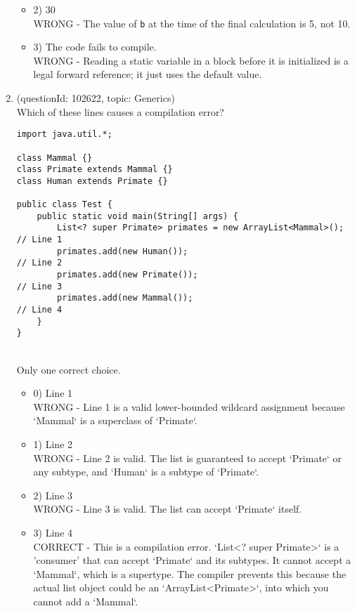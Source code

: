 \documentclass[12pt]{article}
\begin{document}
\begin{enumerate}[label=(\arabic*)]
\begin{itemize}
\item 2) 30
 \\ 
WRONG - The value of \verb|b| at the time of the final calculation is 5, not 10.

\item 3) The code fails to compile.
 \\ 
WRONG - Reading a static variable in a block before it is initialized is a legal forward reference; it just uses the default value.

\end{itemize}
\item (questionId: 102622, topic: Generics) \\ 
Which of these lines causes a compilation error?\begin{verbatim}
import java.util.*;

class Mammal {}
class Primate extends Mammal {}
class Human extends Primate {}

public class Test {
    public static void main(String[] args) {
        List<? super Primate> primates = new ArrayList<Mammal>(); // Line 1
        primates.add(new Human());                                // Line 2
        primates.add(new Primate());                              // Line 3
        primates.add(new Mammal());                               // Line 4
    }
}
\end{verbatim}
\\ \noindent Only one correct choice. 
\begin{itemize}
\item 0) Line 1
 \\ 
WRONG - Line 1 is a valid lower-bounded wildcard assignment because `Mammal` is a superclass of `Primate`.

\item 1) Line 2
 \\ 
WRONG - Line 2 is valid. The list is guaranteed to accept `Primate` or any subtype, and `Human` is a subtype of `Primate`.

\item 2) Line 3
 \\ 
WRONG - Line 3 is valid. The list can accept `Primate` itself.

\item 3) Line 4
 \\ 
CORRECT - This is a compilation error. `List<? super Primate>` is a 'consumer' that can accept `Primate` and its subtypes. It cannot accept a `Mammal`, which is a supertype. The compiler prevents this because the actual list object could be an `ArrayList<Primate>`, into which you cannot add a `Mammal`.


\end{itemize}
\end{enumerate}
\end{document}
